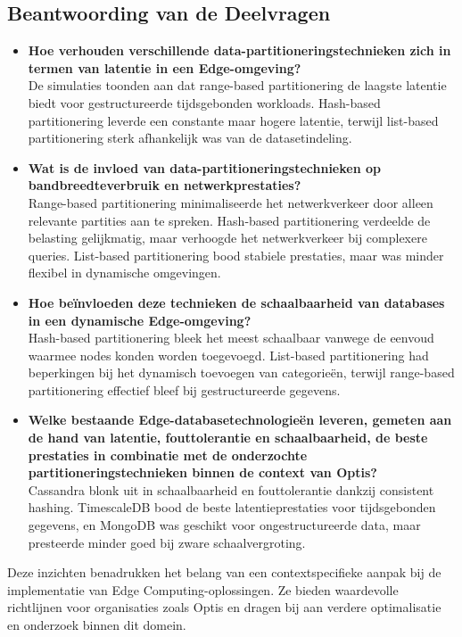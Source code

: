 \subsection{Beantwoording van de Deelvragen}
\begin{itemize}
    \item \textbf{Hoe verhouden verschillende data-partitioneringstechnieken zich in termen van latentie in een Edge-omgeving?} \\
    De simulaties toonden aan dat range-based partitionering de laagste latentie biedt voor gestructureerde tijdsgebonden workloads. Hash-based partitionering leverde een constante maar hogere latentie, terwijl list-based partitionering sterk afhankelijk was van de datasetindeling.

    \item \textbf{Wat is de invloed van data-partitioneringstechnieken op bandbreedteverbruik en netwerkprestaties?} \\
    Range-based partitionering minimaliseerde het netwerkverkeer door alleen relevante partities aan te spreken. Hash-based partitionering verdeelde de belasting gelijkmatig, maar verhoogde het netwerkverkeer bij complexere queries. List-based partitionering bood stabiele prestaties, maar was minder flexibel in dynamische omgevingen.

    \item \textbf{Hoe beïnvloeden deze technieken de schaalbaarheid van databases in een dynamische Edge-omgeving?} \\
    Hash-based partitionering bleek het meest schaalbaar vanwege de eenvoud waarmee nodes konden worden toegevoegd. List-based partitionering had beperkingen bij het dynamisch toevoegen van categorieën, terwijl range-based partitionering effectief bleef bij gestructureerde gegevens.

    \item \textbf{Welke bestaande Edge-databasetechnologieën leveren, gemeten aan de hand van latentie, fouttolerantie en schaalbaarheid, de beste prestaties in combinatie met de onderzochte partitioneringstechnieken binnen de context van Optis?} \\
    Cassandra blonk uit in schaalbaarheid en fouttolerantie dankzij consistent hashing. TimescaleDB bood de beste latentieprestaties voor tijdsgebonden gegevens, en MongoDB was geschikt voor ongestructureerde data, maar presteerde minder goed bij zware schaalvergroting.
\end{itemize}

Deze inzichten benadrukken het belang van een contextspecifieke aanpak bij de implementatie van Edge Computing-oplossingen. Ze bieden waardevolle richtlijnen voor organisaties zoals Optis en dragen bij aan verdere optimalisatie en onderzoek binnen dit domein.

